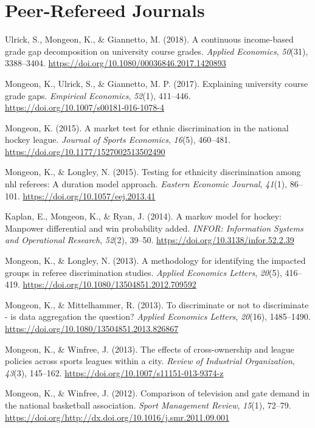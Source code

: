 \hypertarget{peer-refereed-journals}{%
\section*{Peer-Refereed Journals}\label{peer-refereed-journals}}

\hypertarget{refs}{}
\begin{cslreferences}
\leavevmode\hypertarget{ref-ulrick2018continuous}{}%
Ulrick, S., Mongeon, K., \& Giannetto, M. (2018). A continuous
income-based grade gap decomposition on university course grades.
\emph{Applied Economics}, \emph{50}(31), 3388--3404.
\url{https://doi.org/10.1080/00036846.2017.1420893}

\leavevmode\hypertarget{ref-mongeon2016explaining}{}%
Mongeon, K., Ulrick, S., \& Giannetto, M. P. (2017). Explaining
university course grade gaps. \emph{Empirical Economics}, \emph{52}(1),
411--446. \url{https://doi.org/10.1007/s00181-016-1078-4}

\leavevmode\hypertarget{ref-mongeon2015market}{}%
Mongeon, K. (2015). A market test for ethnic discrimination in the
national hockey league. \emph{Journal of Sports Economics},
\emph{16}(5), 460--481. \url{https://doi.org/10.1177/1527002513502490}

\leavevmode\hypertarget{ref-mongeon2015testing}{}%
Mongeon, K., \& Longley, N. (2015). Testing for ethnicity discrimination
among nhl referees: A duration model approach. \emph{Eastern Economic
Journal}, \emph{41}(1), 86--101.
\url{https://doi.org/10.1057/eej.2013.41}

\leavevmode\hypertarget{ref-kaplan2014markov}{}%
Kaplan, E., Mongeon, K., \& Ryan, J. (2014). A markov model for hockey:
Manpower differential and win probability added. \emph{INFOR:
Information Systems and Operational Research}, \emph{52}(2), 39--50.
\url{https://doi.org/10.3138/infor.52.2.39}

\leavevmode\hypertarget{ref-mongeon2013methodology}{}%
Mongeon, K., \& Longley, N. (2013). A methodology for identifying the
impacted groups in referee discrimination studies. \emph{Applied
Economics Letters}, \emph{20}(5), 416--419.
\url{https://doi.org/10.1080/13504851.2012.709592}

\leavevmode\hypertarget{ref-mongeon2013discriminate}{}%
Mongeon, K., \& Mittelhammer, R. (2013). To discriminate or not to
discriminate - is data aggregation the question? \emph{Applied Economics
Letters}, \emph{20}(16), 1485--1490.
\url{https://doi.org/10.1080/13504851.2013.826867}

\leavevmode\hypertarget{ref-mongeon2013effects}{}%
Mongeon, K., \& Winfree, J. (2013). The effects of cross-ownership and
league policies across sports leagues within a city. \emph{Review of
Industrial Organization}, \emph{43}(3), 145--162.
\url{https://doi.org/10.1007/s11151-013-9374-z}

\leavevmode\hypertarget{ref-mongeon2012comparison}{}%
Mongeon, K., \& Winfree, J. (2012). Comparison of television and gate
demand in the national basketball association. \emph{Sport Management
Review}, \emph{15}(1), 72--79.
\url{https://doi.org/http://dx.doi.org/10.1016/j.smr.2011.09.001}
\end{cslreferences}
